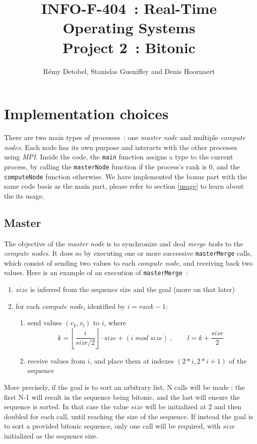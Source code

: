 \documentclass[a4paper,11pt]{article}
\title{INFO-F-404~: Real-Time Operating Systems\\Project 2~: Bitonic}
\author{Rémy Detobel, Stanislas Gueniffey and Denis Hoornaert}
\begin{document}
\maketitle

\section{Implementation choices}

  There are two main types of processes~: one \textit{master node} and multiple \textit{compute nodes}. Each node has its own purpose and interacts with the other processes using \textit{MPI}. Inside the code, the \texttt{main} function assigns a type to the current process, by calling the \texttt{masterNode} function if the process's rank is 0, and the \texttt{computeNode} function otherwise. We have implemented the bonus part with the same code basis as the main part, please refer to section \ref{usage} to learn about the its usage.

\subsection{Master}\label{master-node}
  \noindent The objective of the \textit{master node} is to synchronize and deal \textit{merge tasks} to the \textit{compute nodes}. It does so by executing one or more successive \texttt{masterMerge} calls, which consist of sending two values to each \textit{compute node}, and receiving back two values. Here is an example of an execution of \texttt{masterMerge}~:
  \begin{enumerate}
  \item $size$ is inferred from the sequence size and the goal (more on that later)
  \item for each \textit{compute node}, identified by $i = rank-1$:
  \begin{enumerate}
  	\item send values $(v_k, v_l)$ to $i$, where $$k = \left \lfloor{\frac{i}{size/2}} \right \rfloor \cdot size + (i\;mod\;size)\;, \qquad l = k+\frac{size}{2}$$
    \item receive values from $i$, and place them at indexes $(2*i, 2*i+1)$ of the sequence
  \end{enumerate}
  \end{enumerate}
  More precisely, if the goal is to sort an arbitrary list, N calls will be made : the first N-1 will result in the sequence being bitonic, and the last will ensure the sequence is sorted. In that case the value $size$ will be initialized at $2$ and then doubled for each call, until reaching the size of the sequence. If instead the goal is to sort a provided bitonic sequence, only one call will be required, with $size$ initialized as the sequence size.\\
  
\end{document}
